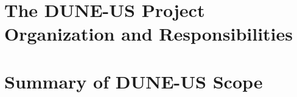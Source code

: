 

\section{The DUNE-US Project Organization and Responsibilities}
\label{intro:collab-proj}



\section{Summary of DUNE-US Scope}
\label{intro:us-scope}
